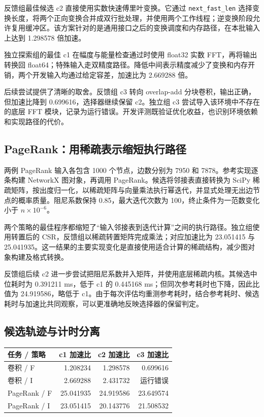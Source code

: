 反馈组最佳候选 c2 直接使用实数快速傅里叶变换。它通过 \texttt{next\_fast\_len} 选择变换长度，将两个正向变换合并成双行批处理，并使用两个工作线程；逆变换阶段允许复用缓冲区。该方案针对的是通用接口之后的变换调度和内存路径，在本批输入上达到 1.298578 倍加速。

独立探索组的最佳 c1 在幅度与能量检查通过时使用 float32 实数 FFT，再将输出转换回 float64；特殊输入走双精度路径。降低中间表示精度减少了变换和内存开销，两个开发输入均通过给定容差，加速比为 2.669288 倍。

后续尝试提供了清晰的取舍。反馈组 c3 转向 overlap-add 分块卷积，输出正确，但加速比降到 0.699616，选择器继续保留 c2。独立组 c3 尝试导入该环境中不存在的底层 FFT 模块，记录为运行错误。开发评测既验证优化收益，也识别环境依赖和实现路径的代价。

\subsection{PageRank：用稀疏表示缩短执行路径}
两例 PageRank 输入各包含 1000 个节点，边数分别为 7950 和 7878。参考实现逐条构建 NetworkX 图对象，再调用 PageRank。候选将邻接表直接转换为 SciPy 稀疏矩阵，按出度归一化，以稀疏矩阵与向量乘法执行幂迭代，并显式处理无出边节点的概率质量。阻尼系数保持 0.85，最大迭代次数为 100，终止条件为一范数变化小于 $n\times10^{-6}$。

两个策略的最佳程序都缩短了“输入邻接表到迭代计算”之间的执行路径。独立组使用转置后的 CSR，反馈组以稀疏转置矩阵完成乘法；对应加速比为 23.051415 与 25.041935。这一结果的主要实现变化是直接使用适合计算的稀疏结构，减少图对象构建及格式转换。

反馈组后续 c2 进一步尝试把阻尼系数并入矩阵，并使用底层稀疏内核。其候选中位耗时为 0.391211 ms，低于 c1 的 0.445168 ms；但同次参考耗时也下降，因此比值为 24.919586，略低于 c1。由于每次评估均重测参考耗时，结合参考耗时、候选耗时与加速比共同观察，可以更准确地反映选择器的保留判定。

\subsection{候选轨迹与计时分离}
\begin{smalltable}
\begin{tabularx}{\linewidth}{@{}Lrrr@{}}\toprule
任务 / 策略 & c1 加速比 & c2 加速比 & c3 加速比\\\midrule
卷积 / F & 1.208234 & 1.298578 & 0.699616\\
卷积 / I & 2.669288 & 2.431732 & 运行错误\\
PageRank / F & 25.041935 & 24.919586 & 23.649574\\
PageRank / I & 23.051415 & 20.143776 & 21.508532\\\bottomrule
\end{tabularx}
\end{smalltable}

